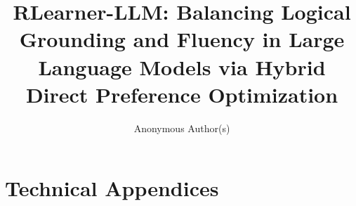\documentclass{article}
\title{\textbf{RLearner-LLM}: Balancing Logical Grounding and Fluency in Large Language Models via Hybrid Direct Preference Optimization}
\author{%
  Anonymous Author(s)
}
\begin{document}
\maketitle














\appendix

\section{Technical Appendices}


\newpage

\end{document}
